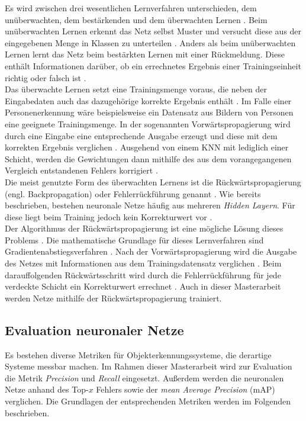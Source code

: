 		Es wird zwischen drei wesentlichen Lernverfahren unterschieden, dem unüberwachten, dem bestärkenden und dem überwachten Lernen \cite{Kriesel}. Beim unüberwachten Lernen erkennt das Netz selbst Muster und versucht diese aus der eingegebenen Menge in Klassen zu unterteilen \cite{Kriesel}. Anders als beim unüberwachten Lernen lernt das Netz beim bestärkten Lernen mit einer Rückmeldung. Diese enthält Informationen darüber, ob ein errechnetes Ergebnis einer Trainingseinheit richtig oder falsch ist \cite{Kriesel}.\\
		
		Das überwachte Lernen setzt eine Trainingsmenge voraus, die neben der Eingabedaten auch das dazugehörige korrekte Ergebnis enthält \cite{Kriesel,bildv2020}. Im Falle einer Personenerkennung wäre beispielsweise ein Datensatz aus Bildern von Personen eine geeignete Trainingsmenge. In der sogenannten Vorwärtspropagierung wird durch eine Eingabe eine entsprechende Ausgabe erzeugt und diese mit dem korrekten Ergebnis verglichen \cite{bildv2020}. Ausgehend von einem KNN mit lediglich einer Schicht, werden die Gewichtungen dann mithilfe des aus dem vorangegangenen Vergleich entstandenen Fehlers korrigiert \cite{bildv2020}.\\
		
		Die meist genutzte Form des überwachten Lernens ist die Rückwärtspropagierung (engl. Backpropagation) oder Fehlerrückführung genannt \cite{Ertel}. Wie bereits beschrieben, bestehen neuronale Netze häufig aus mehreren \textit{Hidden Layern}. Für diese liegt beim Training jedoch kein Korrekturwert vor \cite{bildv2020}.\\
		
		Der Algorithmus der Rückwärtspropagierung ist eine mögliche Lösung dieses Problems \cite{bildv2020}. Die mathematische Grundlage für dieses Lernverfahren sind Gradientenabstiegsverfahren \cite{Kriesel,bildv2020}. Nach der Vorwärtspropagierung wird die Ausgabe des Netzes mit Informationen aus dem Trainingsdatensatz verglichen \cite{bildv2020}. Beim darauffolgenden Rückwärtsschritt wird durch die Fehlerrückführung für jede verdeckte Schicht ein Korrekturwert errechnet \cite{bildv2020}. Auch in dieser Masterarbeit werden Netze mithilfe der Rückwärtspropagierung trainiert.\\
		
	
		
		\subsection{Evaluation neuronaler Netze}
		\label{subsec: evaluation neuronaler netze}
		Es bestehen diverse Metriken für Objekterkennungssysteme, die derartige Systeme messbar machen. Im Rahmen dieser Masterarbeit wird zur Evaluation die Metrik \textit{Precision} und \textit{Recall} eingesetzt. Außerdem werden die neuronalen Netze anhand des Top-$x$ Fehlers sowie der \textit{mean Average Precision} (mAP) verglichen. Die Grundlagen der entsprechenden Metriken werden im Folgenden beschrieben.\\
		
